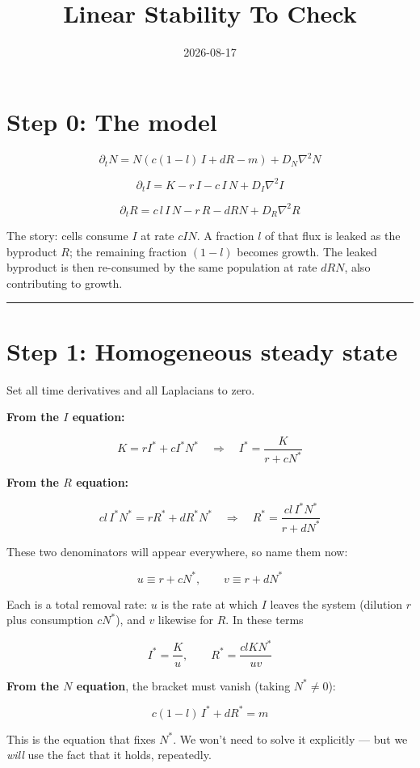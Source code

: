 \documentclass[11pt]{article}
\title{Linear Stability To Check}
\date{2026-08-17}
\author{}
\begin{document}
\maketitle

\section*{Step 0: The model}

\[
\partial_t N = N\left(c(1-l)\,I + d R - m\right) + D_N \nabla^2 N
\]

\[
\partial_t I = K - r\, I - c\, I\, N + D_I \nabla^2 I
\]

\[
\partial_t R = c\, l\, I\, N - r\, R - d R N + D_R \nabla^2 R
\]

The story: cells consume $I$ at rate $c I N$. A fraction $l$ of that flux is leaked as the byproduct $R$; the remaining fraction $(1-l)$ becomes growth. The leaked byproduct is then re-consumed by the same population at rate $d R N$, also contributing to growth.

\bigskip\hrule\bigskip

\section*{Step 1: Homogeneous steady state}

Set all time derivatives and all Laplacians to zero.

\textbf{From the $I$ equation:}

\[
K = r I^* + c I^* N^* \quad\Longrightarrow\quad I^* = \frac{K}{r + c N^*}
\]

\textbf{From the $R$ equation:}

\[
c l\, I^* N^* = r R^* + d R^* N^* \quad\Longrightarrow\quad R^* = \frac{c l\, I^* N^*}{r + d N^*}
\]

These two denominators will appear everywhere, so name them now:

\[
\boxed{\;u \equiv r + c N^*, \qquad v \equiv r + d N^*\;}
\]

Each is a total removal rate: $u$ is the rate at which $I$ leaves the system (dilution $r$ plus consumption $cN^*$), and $v$ likewise for $R$. In these terms

\[
I^* = \frac{K}{u}, \qquad R^* = \frac{c l K N^*}{uv}
\]

\textbf{From the $N$ equation}, the bracket must vanish (taking $N^*\neq 0$):

\[
c(1-l)\, I^* + d R^* = m
\]

This is the equation that fixes $N^*$. We won't need to solve it explicitly --- but we \emph{will} use the fact that it holds, repeatedly.
\end{document}
